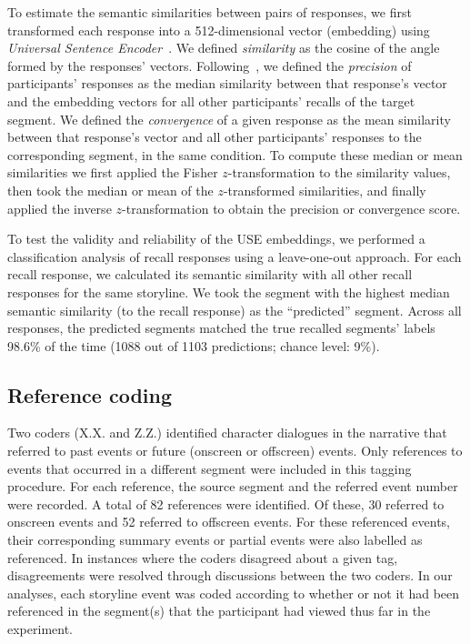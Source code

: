 \documentclass[10pt]{article}
\begin{document}
To estimate the semantic similarities between pairs of responses, we first transformed each response into a 512-dimensional vector (embedding) using \textit{Universal Sentence Encoder}~\citep[Transformer USE, ][]{CerEtal18}.  We defined \textit{similarity} as the cosine of the angle formed by the responses' vectors.  Following~\cite{HeusEtal21}, we defined the \textit{precision} of participants' responses as the median similarity between that response's vector and the embedding vectors for all other participants' recalls of the target segment.  We defined the \textit{convergence} of a given response as the mean similarity between that response's vector and all other participants' responses to the corresponding segment, in the same condition.  To compute these median or mean similarities we first applied the Fisher $z$-transformation to the similarity values, then took the median or mean of the $z$-transformed similarities, and finally applied the inverse $z$-transformation to obtain the precision or convergence score.

To test the validity and reliability of the USE embeddings, we performed a classification analysis of recall responses using a leave-one-out approach. For each recall response, we calculated its semantic similarity with all other recall responses for the same storyline.  We took the segment with the highest median semantic similarity (to the recall response) as the ``predicted'' segment.  Across all responses, the predicted segments matched the true recalled segments' labels 98.6\% of the time (1088 out of 1103 predictions; chance level: 9\%).

\subsection*{Reference coding}
Two coders (X.X. and Z.Z.) identified character dialogues in the narrative that referred to past events or future (onscreen or offscreen) events.  Only references to events that occurred in a different segment were included in this tagging procedure.  For each reference, the source segment and the referred event number were recorded. A total of 82 references were identified.  Of these, 30 referred to onscreen events and 52 referred to offscreen events. For these referenced events, their corresponding summary events or partial events were also labelled as referenced. In instances where the coders disagreed about a given tag, disagreements were resolved through discussions between the two coders.  In our analyses, each storyline event was coded according to whether or not it had been referenced in the segment(s) that the participant had viewed thus far in the experiment.
\end{document}
